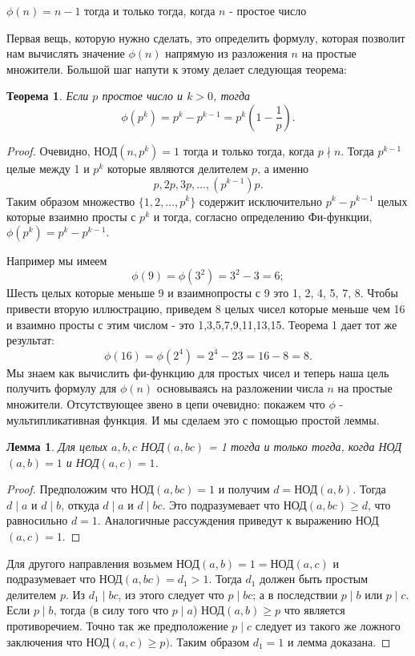 \documentclass[11pt]{article}
\newtheorem{theorem}{Теорема}
\newtheorem{lemma}{Лемма}
\begin{document}
\begin{center}
	$\phi (n)=n-1$ тогда и только тогда, когда $n$ - простое число
\end{center}
Первая вещь, которую нужно сделать, это определить формулу, которая позволит нам вычислять значение $\phi (n)$ напрямую из разложения $n$ на простые множители. Большой шаг напути к этому делает следующая теорема: 
\begin{theorem}
	Если $ p $ простое число и $ k>0 $, тогда 
	\[\phi (p^{k})=	p^{k}-p^{k-1}=p^{k}(1-\dfrac{1}{p}).\]
\end{theorem} 
\begin{proof}
	Очевидно, НОД$(n,p^k)=1$ тогда и только тогда, когда $p\nmid n$. Тогда $p^{k-1}$ целые между 1 и $p^{k}$ которые являются делителем $p$, а именно  
	\[p,2p,3p, ..., (p^{k-1})p.\] Таким образом множество $\{1,2,...,p^k\}$ содержит исключительно $p^{k}-p^{k-1}$ целых которые взаимно просты с $p^k$ и тогда, согласно определению Фи-функции, $\phi (p^k)=p^{k}-p^{k-1}.$	
	
	Например мы имеем 
	\[
	\phi (9)=\phi (3^2)=3^{2}-3=6;
	\]
	Шесть целых которые меньше 9 и взаимнопросты с 9 это 1, 2, 4, 5, 7, 8.
	Чтобы привести вторую иллюстрацию, приведем 8 целых чисел которые меньше чем 16 и взаимно просты с этим числом - это 1,3,5,7,9,11,13,15. Теорема 1 дает тот же результат:
	\[
	\phi (16)= \phi (2^4)=2^{4}-2{3}=16-8=8.
	\]
	Мы знаем как вычислить фи-функцию для простых чисел и теперь наша цель получить формулу для $\phi (n)$ основываясь на разложении числа $n$ на простые множители. Отсутствующее звено в цепи очевидно: покажем что $\phi $ - мультипликативная функция. И мы сделаем это с помощью простой леммы.
	
\begin{lemma}
Для целых $a, b, c$ НОД$(a,bc)$ = 1 тогда и только тогда, когда НОД$(a,b)=1$ и НОД$(a,c)=1$.
\end{lemma}
\begin{proof}
	Предположим что НОД$(a,bc)=1$ и получим $d=$НОД$(a,b)$. Тогда $d\mid a$ и $d\mid b$, откуда $d \mid a$ и $d\mid bc$. Это подразумевает что НОД$(a,bc) \geq d$, что равносильно $d=1$. Аналогичные рассуждения приведут к выражению НОД$(a,c)=1$. 
\end{proof}
	Для другого направления возьмем НОД$(a,b)=1=$НОД$(a,c)$ и подразумевает что НОД$(a,bc)=d_{1}>1.$ Тогда $d_1$ должен быть простым делителем $p$. Из $d_{1} \mid bc$, из этого следует что $p \mid bc$; а в последствии $p \mid b$ или $p \mid c$. Если $p \mid b$, тогда (в силу того что $p \mid a$) НОД$(a,b) \geq p $ что является противоречием. Точно так же предположение $p \mid c$ следует из такого же ложного заключения что НОД$(a,c) \geq p)$. Таким образом $d_1 = 1$ и лемма доказана.
\end{proof}
\end{document}
